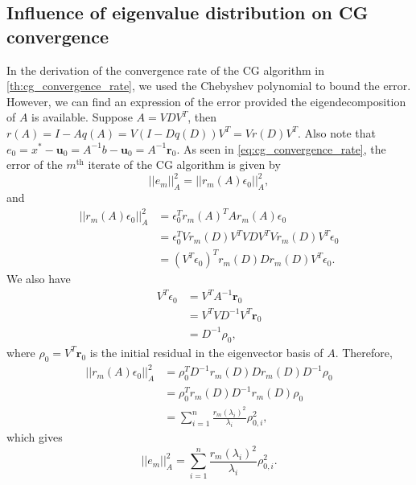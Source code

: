 \subsection{Influence of eigenvalue distribution on CG convergence}\label{sec:cg_eigenvalue_distribution}
In the derivation of the convergence rate of the CG algorithm in \ref{th:cg_convergence_rate}, we used the Chebyshev polynomial to bound the error. However, we can find an expression of the error provided the eigendecomposition of $A$ is available. Suppose $A = VDV^T$, then $r(A) = I - Aq(A) = V(I - Dq(D))V^T = Vr(D)V^T$. Also note that $e_0 = x^* - \mathbf{u}_0 = A^{-1}b - \mathbf{u}_0 = A^{-1}\mathbf{r}_0$. As seen in \cref{eq:cg_convergence_rate}, the error of the $m^{\text{th}}$ iterate of the CG algorithm is given by
\begin{equation*}
  ||e_m||_A^2 = ||r_m(A)\epsilon_0||_A^2,
\end{equation*}
and
\begin{align*}
  ||r_m(A)\epsilon_0||_A^2 & = \epsilon_0^T r_m(A)^T A r_m(A) \epsilon_0                 \\
                           & = \epsilon_0^T V r_m(D) V^T V D V^T V r_m(D) V^T \epsilon_0 \\
                           & = (V^T\epsilon_0)^T r_m(D) D r_m(D) V^T \epsilon_0.
\end{align*}
We also have
\begin{align*}
  V^T\epsilon_0 & = V^T A^{-1} \mathbf{r}_0       \\
                & = V^T V D^{-1} V^T \mathbf{r}_0 \\
                & = D^{-1} \rho_0,
\end{align*}
where $\rho_0 = V^T \mathbf{r}_0$ is the initial residual in the eigenvector basis of $A$. Therefore,
\begin{align*}
  ||r_m(A)\epsilon_0||_A^2 & = \rho_0^T D^{-1} r_m(D) D r_m(D) D^{-1} \rho_0                 \\
                           & = \rho_0^T r_m(D) D^{-1} r_m(D)  \rho_0                         \\
                           & = \sum_{i=1}^n \frac{r_m(\lambda_i)^2}{\lambda_i} \rho_{0,i}^2,
\end{align*}
which gives
\begin{equation}
  ||e_m||_A^2 = \sum_{i=1}^n \frac{r_m(\lambda_i)^2}{\lambda_i} \rho_{0,i}^2.
  \label{eq:cg_error_eigenvalue}
\end{equation}

